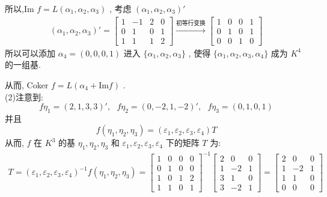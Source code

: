 \documentclass[11pt,a4paper,openany,oneside]{book}
\begin{document}
所以,Im $ f = L(\alpha_1, \alpha_2, \alpha_3) $ , 考虑 $ (\alpha_1, \alpha_2, \alpha_3)' $ 
\begin{gather*}
(\alpha_1, \alpha_2, \alpha_3)' =
\begin{bmatrix}
1  &  -1  &  2  &  0 \\
0  &  1  &  0  &  1  \\
1  &  1  &  1  &  2
\end{bmatrix}
\xrightarrow{初等行变换}
\begin{bmatrix}
1   &  0 &    0  &   1  \\
0   &  1 &    0  &   1  \\
0   &  0 &    1  &   0
\end{bmatrix}
\end{gather*}
所以可以添加 $ \alpha_4 = (0,0,0,1) $ 进入 $ \{\alpha_1, \alpha_2, \alpha_3 \} $ , 使得 $ \{\alpha_1, \alpha_2, \alpha_3, \alpha_4\} $ 成为 $ K^4 $ 的一组基.

从而, Coker $ f = L(\alpha_4 +  \mathrm{Im} f)  $ .  \\ 

(2)注意到:
 $$  f\eta_1 = (2, 1, 3, 3)', \ \ \ f\eta_2 = (0,-2,1,-2)', \ \ \ f\eta_3=(0, 1, 0, 1)  $$ 
并且
 $$  f(\eta_1, \eta_2, \eta_3) = (\varepsilon_1, \varepsilon_2, \varepsilon_3, \varepsilon_4)T  $$ 
从而,  $ f $ 在 $ K^3 $ 的基 $ \eta_1, \eta_2, \eta_3 $ 和 $ \varepsilon_1, \varepsilon_2, \varepsilon_3, \varepsilon_4 $ 下的矩阵 $ T $ 为:
\begin{gather*}
T = (\varepsilon_1, \varepsilon_2, \varepsilon_3, \varepsilon_4)^{-1}f(\eta_1, \eta_2, \eta_3)=
\begin{bmatrix}
1  &  0  &  0  &  0 \\
0  &  1  &  0  &  0  \\
1  &  0  &  1  &  2  \\
1  &  1  &  0  &  1
\end{bmatrix}^{-1}
\begin{bmatrix}
2  &  0  &  0\\
1  &  -2  &  1  \\
3  &  1  &  0  \\
3  &  -2  &  1
\end{bmatrix}
=
\begin{bmatrix}
2  &   0  &   0  \\
1  &  -2   &  1\\
1  &  1  &   0\\
0 &    0   &  0
\end{bmatrix}
\end{gather*}  \\  \\  \\
\end{document}
